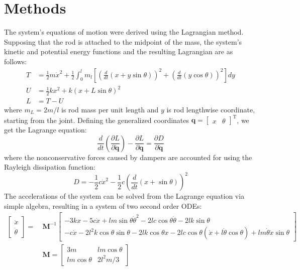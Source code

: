 \documentclass{article}
\begin{document}
	\section*{Methods}
	The system's equations of motion were derived using the Lagrangian method. Supposing that the rod is attached to the midpoint of the mass, the system's kinetic and potential energy functions and the resulting Lagrangian are as follows:
	\begin{equation}
		\begin{aligned}
		T &= \frac{1}{2} m \dot{x}^2 + \frac{1}{2} \int_{0}^{l} m_l \left[ \left( \frac{d}{dt} (x + y \sin \theta) \right)^2 + \left( \frac{d}{dt} (y \cos \theta) \right)^2 \right] dy \\
		U &= \frac{1}{2} k x^2 + k (x + L \sin \theta)^2 \\
		L &= T - U
		\end{aligned}
	\end{equation}
	where $m_L = 2 m / l$ is rod mass per unit length and $y$ is rod lengthwise coordinate, starting from the joint. Defining the generalized coordinates $\bm{q} = \begin{bmatrix} x & \theta \end{bmatrix}^\text{T}$, we get the Lagrange equation:
	\begin{equation}
		\frac{d}{dt}\left(\frac{\partial L}{\partial \dot{\bm{q}}}\right) - \frac{\partial L}{\partial \bm{q}} = \frac{\partial D}{\partial \dot{\bm{q}}}
	\end{equation}
	where the nonconservative forces caused by dampers are accounted for using the Rayleigh dissipation function:
	\begin{equation}
	D = - \frac{1}{2} c \dot{x}^2 - \frac{1}{2} c \left(\frac{d}{dt} (x + \sin \theta) \right)^2
	\end{equation}	
	The accelerations of the system can be solved from the Lagrange equation via simple algebra, resulting in a system of two second order ODEs:	
	\begin{equation}
		\begin{aligned}
		\begin{bmatrix}
		\ddot{x} \\ \ddot{\theta}
		\end{bmatrix} =
		~&\mathbf{M}^{-1}
		\begin{bmatrix}
		- 3 k x - 5 c \dot{x} + l m \sin \theta \dot{\theta}^2 - 2 l c \cos \theta \dot{\theta} - 2  l k \sin \theta\\
		- c \dot{x} - 2 l^2 k \cos \theta \sin \theta - 2 l k \cos \theta x - 2 l c \cos \theta (\dot{x} + l \dot{\theta} \cos \theta) + l m \dot{\theta} \dot{x} \sin \theta
		\end{bmatrix}\\
		& \mathbf{M} =
		\begin{bmatrix}
		3 m & l m \cos \theta \\
		l m \cos \theta & 2 l^2 m / 3
		\end{bmatrix}
		\end{aligned}
	\end{equation}
\end{document}
